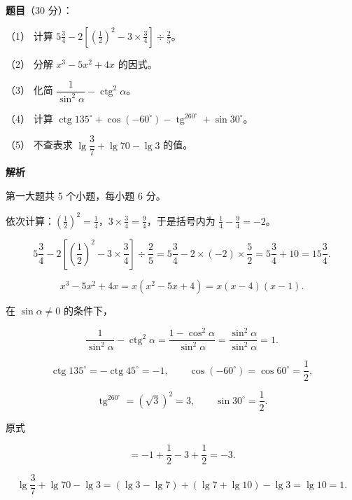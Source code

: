 \begin{answer}

\textbf{题目}（30 分）：

（1） 计算 $5\frac{3}{4}-2\left[\left(\frac{1}{2}\right)^2-3\times\frac{3}{4}\right]\div\frac{2}{5}$。

（2） 分解 $x^3-5x^2+4x$ 的因式。

（3） 化简 $\dfrac{1}{\sin^2\alpha}-\operatorname{ctg}^2\alpha$。

（4） 计算 $\operatorname{ctg}135^\circ+\cos(-60^\circ)-\operatorname{tg}^260^\circ+\sin30^\circ$。

（5） 不查表求 $\lg\dfrac{3}{7}+\lg70-\lg3$ 的值。

\textbf{解析}

第一大题共 5 个小题，每小题 6 分。


依次计算：$\left(\frac12\right)^2=\frac14$，$3\times\frac34=\frac94$，于是括号内为 $\frac14-\frac94=-2$。

\nopagebreak[4]
\[
5\frac34-2\left[\left(\frac12\right)^2-3\times\frac34\right]\div\frac25
=5\frac34-2\times(-2)\times\frac52
=5\frac34+10=15\frac34.
\]


\nopagebreak[4]
\[
x^3-5x^2+4x=x(x^2-5x+4)=x(x-4)(x-1).
\]


在 $\sin\alpha\ne0$ 的条件下，

\nopagebreak[4]
\[
\frac{1}{\sin^2\alpha}-\operatorname{ctg}^2\alpha
=\frac{1-\cos^2\alpha}{\sin^2\alpha}
=\frac{\sin^2\alpha}{\sin^2\alpha}=1.
\]


\nopagebreak[4]
\[
\operatorname{ctg}135^\circ=-\operatorname{ctg}45^\circ=-1,
\qquad
\cos(-60^\circ)=\cos60^\circ=\frac12,
\]

\nopagebreak[4]
\[
\operatorname{tg}^260^\circ=(\sqrt3)^2=3,
\qquad
\sin30^\circ=\frac12.
\]

原式

\nopagebreak[4]
\[
=-1+\frac12-3+\frac12=-3.
\]


\nopagebreak[4]
\[
\lg\frac37+\lg70-\lg3
=(\lg3-\lg7)+(\lg7+\lg10)-\lg3
=\lg10=1.
\]






\end{answer}
